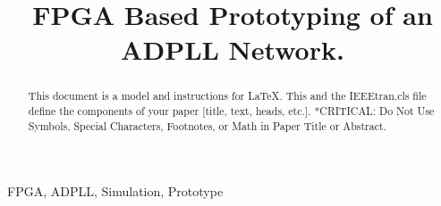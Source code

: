 \documentclass[conference]{IEEEtran}
\begin{document}
\title{FPGA Based Prototyping of an ADPLL Network.\\}

\author{
}

\maketitle

\begin{abstract}
	This document is a model and instructions for \LaTeX.
	This and the IEEEtran.cls file define the components of your paper [title, text, heads, etc.]. *CRITICAL: Do Not Use Symbols, Special Characters, Footnotes, 
	or Math in Paper Title or Abstract.
\end{abstract}

\begin{IEEEkeywords}
	FPGA, ADPLL, Simulation, Prototype
\end{IEEEkeywords}
\end{document}
